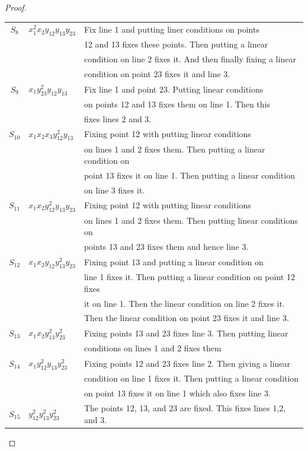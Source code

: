 \documentclass[12pt]{article}
\theoremstyle{plain}
\theoremstyle{definition}
\begin{document}
\begin{proof}
\begin{longtable}{|c|l|l|}
\hline 
$S_8$ & $x_1^2x_2y_{12}y_{13}y_{23}$ & Fix line 1 and putting liner conditions on points \\
&&12 and 13 fixes these points. Then putting a linear\\
&& condition on line 2 fixes it. And then finally fixing a linear \\
&& condition on point 23 fixes it and line 3.\\
\hline 
$S_9$ &$x_1y_{23}^2y_{12}y_{13}$ & Fix line 1 and point 23. Putting linear conditions \\
&&on points 12 and 13 fixes them on line 1. Then this \\
&& fixes lines 2 and 3.\\
\hline
$S_{10}$ &$x_1x_2x_3y_{12}^2y_{13}$ &  Fixing point 12 with putting linear conditions \\
&& on lines 1 and 2 fixes them. Then putting a linear condition on \\
&& point 13 fixes it on line 1. Then putting a linear condition\\
&& on line 3 fixes it.\\
\hline 
$S_{11}$&$x_1x_2y_{12}^2y_{13}y_{23}$ & Fixing point 12 with putting linear conditions \\
&& on lines 1 and 2 fixes them. Then putting linear conditions on\\
&& points 13 and 23 fixes them and hence line 3.\\
\hline
$S_{12}$ &$x_1x_2y_{12}y_{13}^2y_{23}$ & Fixing point 13 and putting a linear condition on \\
&& line 1 fixes it. Then putting a linear condition on point 12 fixes \\
&& it on line 1. Then the linear condition on line 2 fixes it.\\
&&Then the linear condition on point 23 fixes it and line 3.\\
\hline
$S_{13}$ &$x_1x_2y_{13}^2y_{23}^2$& Fixing points 13 and 23 fixes line 3. Then  putting linear\\
&&conditions on lines 1 and 2 fixes them\\
\hline
$S_{14}$ & $x_1y_{12}^2y_{13}y_{23}^2$& Fixing points 12 and 23 fixes line 2. Then giving a linear\\
&&condition on line 1 fixes it. Then putting a linear condition\\
&& on point 13 fixes it on line 1 which also fixes line 3.\\
\hline
$S_{15}$&$y_{12}^2y_{13}^2y_{23}^2$ & The points 12, 13, and 23 are fixed. This fixes lines 1,2, and 3.\\
\hline
\end{longtable}


\end{proof}
\end{document}

